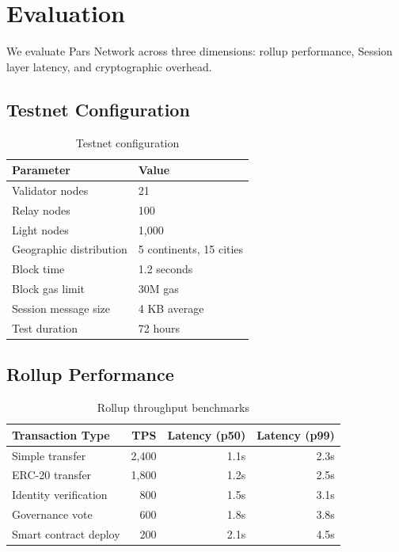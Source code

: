 \documentclass[11pt,a4paper]{article}
\begin{document}
\section{Evaluation}
\label{sec:evaluation}

We evaluate Pars Network across three dimensions: rollup performance, Session layer latency, and cryptographic overhead.

\subsection{Testnet Configuration}

\begin{table}[H]
\centering
\caption{Testnet configuration}
\label{tab:testnet}
\begin{tabular}{ll}
\toprule
\textbf{Parameter} & \textbf{Value} \\
\midrule
Validator nodes & 21 \\
Relay nodes & 100 \\
Light nodes & 1{,}000 \\
Geographic distribution & 5 continents, 15 cities \\
Block time & 1.2 seconds \\
Block gas limit & 30M gas \\
Session message size & 4 KB average \\
Test duration & 72 hours \\
\bottomrule
\end{tabular}
\end{table}

\subsection{Rollup Performance}

\begin{table}[H]
\centering
\caption{Rollup throughput benchmarks}
\label{tab:rollup_bench}
\begin{tabular}{lrrr}
\toprule
\textbf{Transaction Type} & \textbf{TPS} & \textbf{Latency (p50)} & \textbf{Latency (p99)} \\
\midrule
Simple transfer & 2{,}400 & 1.1s & 2.3s \\
ERC-20 transfer & 1{,}800 & 1.2s & 2.5s \\
Identity verification & 800 & 1.5s & 3.1s \\
Governance vote & 600 & 1.8s & 3.8s \\
Smart contract deploy & 200 & 2.1s & 4.5s \\
\bottomrule
\end{tabular}
\end{table}
\end{document}
